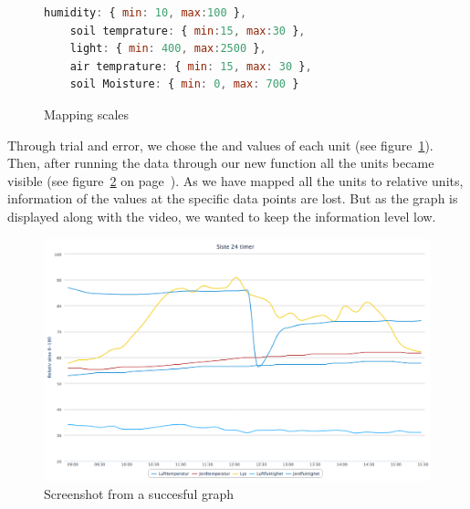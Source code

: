 
\begin{figure}[H]
	\begin{lstlisting}[language=javascript]
	humidity: { min: 10, max:100 },
	soil temprature: { min:15, max:30 },
	light: { min: 400, max:2500 },
	air temprature: { min: 15, max: 30 },
	soil Moisture: { min: 0, max: 700 }
	\end{lstlisting}
	\caption{Mapping scales}
	\label{fig:mapscale}
\end{figure}

Through trial and error, we chose the \verb@C@ and \verb@D@ values of each unit (see figure~\ref{fig:mapscale}). Then, after running the data through our new function all the units became visible (see figure~\ref{fig:goodgraph} on page~\pageref{fig:goodgraph}). As we have mapped all the units to relative units, information of the values at the specific data points are lost. But as the graph is displayed along with the video, we wanted to keep the information level low.  

\begin{figure}
\centering
\includegraphics[width=1\textwidth]{img/interface/goodgraph.png}
\caption{Screenshot from a succesful graph}
\label{fig:goodgraph}
\end{figure}


